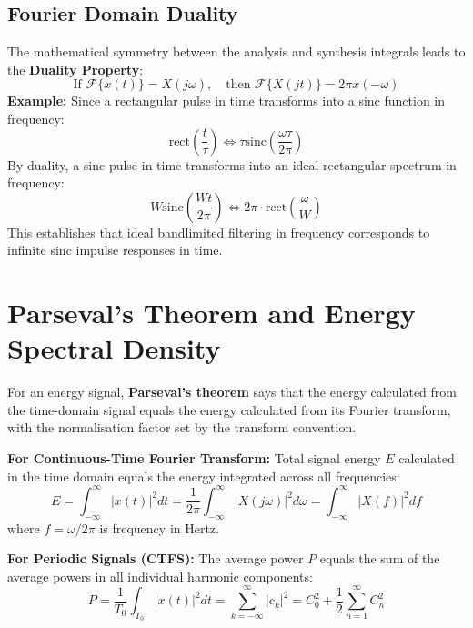 \documentclass[12pt,a4paper]{article}
\begin{document}
\subsection{Fourier Domain Duality}
The mathematical symmetry between the analysis and synthesis integrals leads to the \textbf{Duality Property}:
\begin{equation}
  \text{If } \mathcal{F}\{x(t)\} = X(j\omega), \quad \text{then } \mathcal{F}\{X(jt)\} = 2\pi x(-\omega)
\end{equation}
\textbf{Example:} Since a rectangular pulse in time transforms into a sinc function in frequency:
\begin{equation}
  \text{rect}\left(\frac{t}{\tau}\right) \iff \tau \text{sinc}\left(\frac{\omega\tau}{2\pi}\right)
\end{equation}
By duality, a sinc pulse in time transforms into an ideal rectangular spectrum in frequency:
\begin{equation}
  W \text{sinc}\left(\frac{Wt}{2\pi}\right) \iff 2\pi \cdot \text{rect}\left(\frac{\omega}{W}\right)
\end{equation}
This establishes that ideal bandlimited filtering in frequency corresponds to infinite sinc impulse responses in time.

\section{Parseval's Theorem and Energy Spectral Density}

\begin{tcolorbox}[defbox, title={Meaning of Parseval's Theorem}]
For an energy signal, \textbf{Parseval's theorem} says that the energy calculated from the time-domain signal equals the energy calculated from its Fourier transform, with the normalisation factor set by the transform convention.
\end{tcolorbox}

\begin{tcolorbox}[formulabox, title={\textbf{Parseval's Energy Theorem}}]
\textbf{For Continuous-Time Fourier Transform:}
Total signal energy $E$ calculated in the time domain equals the energy integrated across all frequencies:
\begin{equation}
  E = \int_{-\infty}^{\infty} |x(t)|^2 dt = \frac{1}{2\pi} \int_{-\infty}^{\infty} |X(j\omega)|^2 d\omega = \int_{-\infty}^{\infty} |X(f)|^2 df
\end{equation}
where $f = \omega / 2\pi$ is frequency in Hertz.

\textbf{For Periodic Signals (CTFS):}
The average power $P$ equals the sum of the average powers in all individual harmonic components:
\begin{equation}
  P = \frac{1}{T_0} \int_{T_0} |x(t)|^2 dt = \sum_{k=-\infty}^{\infty} |c_k|^2 = C_0^2 + \frac{1}{2}\sum_{n=1}^{\infty} C_n^2
\end{equation}
\end{tcolorbox}
\end{document}
